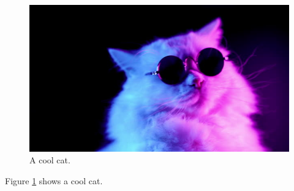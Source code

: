 \documentclass{article}
\begin{document}
\begin{figure}[h!]
	\includegraphics[width=\linewidth]{cool_cat.jpg}
	\caption{A cool cat.}
	\label{fig:cat1}
\end{figure}

Figure \ref{fig:cat1} shows a cool cat.
\end{document}
